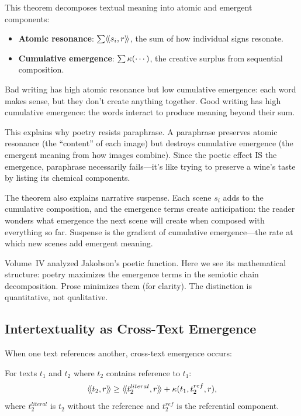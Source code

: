 \begin{interpretation}
This theorem decomposes textual meaning into atomic and emergent components:
\begin{itemize}
  \item \textbf{Atomic resonance}: $\sum \langle\!\langle s_i, r \rangle\!\rangle$, the sum of how individual
    signs resonate.
  \item \textbf{Cumulative emergence}: $\sum \kappa(\cdots)$, the creative
    surplus from sequential composition.
\end{itemize}

Bad writing has high atomic resonance but low cumulative emergence: each word
makes sense, but they don't create anything together. Good writing has high
cumulative emergence: the words interact to produce meaning beyond their sum.

This explains why poetry resists paraphrase. A paraphrase preserves atomic
resonance (the ``content'' of each image) but destroys cumulative emergence
(the emergent meaning from how images combine). Since the poetic effect IS the
emergence, paraphrase necessarily fails---it's like trying to preserve a wine's
taste by listing its chemical components.

The theorem also explains narrative suspense. Each scene $s_i$ adds to the
cumulative composition, and the emergence terms create anticipation: the reader
wonders what emergence the next scene will create when composed with everything
so far. Suspense is the gradient of cumulative emergence---the rate at which
new scenes add emergent meaning.

Volume~IV analyzed Jakobson's poetic function. Here we see its mathematical
structure: poetry maximizes the emergence terms in the semiotic chain decomposition.
Prose minimizes them (for clarity). The distinction is quantitative, not qualitative.
\end{interpretation}

\subsection{Intertextuality as Cross-Text Emergence}

When one text references another, cross-text emergence occurs:

\begin{theorem}
\label{thm:intertextual-emergence}
For texts $t_1$ and $t_2$ where $t_2$ contains reference to $t_1$:
\[
  \langle\!\langle t_2, r \rangle\!\rangle \geq \langle\!\langle t_2^{literal}, r \rangle\!\rangle + \kappa(t_1, t_2^{ref}, r),
\]
where $t_2^{literal}$ is $t_2$ without the reference and $t_2^{ref}$ is the
referential component.
\end{theorem}

